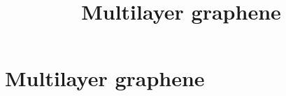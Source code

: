 \documentclass[english,aps,prd,nofootinbib,twocolumn]{revtex4-1}
\begin{document}
\title{Multilayer graphene}








\section*{Multilayer graphene}




\end{document}
